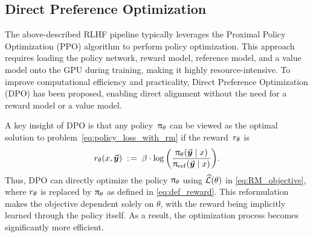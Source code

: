 	
	    
	
	

	
	\subsection{Direct Preference Optimization}
	\label{sec:intro_DPO}

    The above-described RLHF pipeline typically leverages the Proximal Policy Optimization (PPO) algorithm \citep{schulman2017proximal} to perform policy optimization. This approach requires loading the policy network, reward model, reference model, and a value model onto the GPU during training, making it highly resource-intensive. To improve computational efficiency and practicality, Direct Preference Optimization (DPO) \citep{rafailov2023direct} has been proposed, enabling direct alignment without the need for a reward model or a value model.
	
    A key insight of DPO is that any policy~$\uppi_{\theta}$ can be viewed as the optimal solution to problem~\eqref{eq:policy_loss_with_rm} if the reward~$r_{\theta}$ is 
	\vspace{-3mm}
    \begin{align}
		\label{eq:def_reward}
		r_{\theta}(x, \vec{\boldsymbol{y}}\!\,)
		\; :\,= \; \beta \cdot \log \bigg( \frac{\uppi_{\theta}(\vec{\boldsymbol{y}}\!\, \mid x)}{\uppi_{{\rm ref}}(\vec{\boldsymbol{y}}\!\, \mid x)} \bigg).
	\end{align} 
%
%
    Thus, DPO can directly optimize the policy $\uppi_{\theta}$ using $\widehat{\mathcal{L}}(\theta)$ in \cref{eq:RM_objective}, where $r_{\theta}$ is replaced by $\uppi_{\theta}$ as defined in \cref{eq:def_reward}. This reformulation makes the objective dependent solely on $\theta$, with the reward being implicitly learned through the policy itself. As a result, the optimization process becomes significantly more efficient.
	
	
